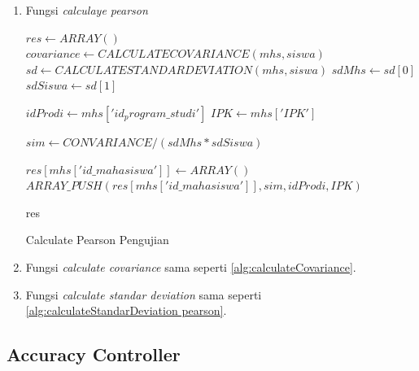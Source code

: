 \begin{enumerate}
        \item Fungsi \textit{calculaye pearson} \\
        
        \begin{algorithm}[H]
            \begin{algorithmic}[1]
                    \State $res \gets ARRAY()$
                            \State $covariance \gets CALCULATECOVARIANCE(mhs, siswa)$
                            \State $sd \gets CALCULATESTANDARDEVIATION(mhs,siswa)$
                            \State $sdMhs \gets sd[0]$
                            \State $sdSiswa \gets sd[1]$
                            
                            \State $idProdi \gets mhs['id_program\_studi']$
                            \State $IPK \gets mhs['IPK']$
                            
                            \State $sim \gets CONVARIANCE / (sdMhs * sdSiswa)$
                            
                                \State $res[mhs['id\_mahasiswa']] \gets ARRAY()$
                                \State $ARRAY\_PUSH(res[mhs['id\_mahasiswa']], sim, idProdi, IPK)$
                            \EndIf
                        \EndIf
                    \EndFor
                
                    \State \Return res
                \EndProcedure
            \end{algorithmic} 
            \caption{Calculate Pearson Pengujian}
            \label{alg:calculatePearsonPengujian}
        \end{algorithm}
        
        \item Fungsi \textit{calculate covariance} sama seperti \ref{alg:calculateCovariance}.
        
        \item Fungsi \textit{calculate standar deviation} sama seperti \ref{alg:calculateStandarDeviation pearson}. 
\end{enumerate}


\subsection{Accuracy Controller}
\label{subsec:accuracy}

